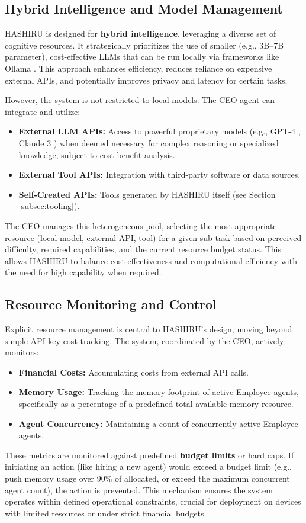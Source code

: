 \documentclass[conference]{IEEEtran}
\begin{document}
\subsection{Hybrid Intelligence and Model Management}
HASHIRU is designed for \textbf{hybrid intelligence}, leveraging a diverse set of cognitive resources. It strategically prioritizes the use of smaller (e.g., 3B--7B parameter), cost-effective LLMs that can be run locally via frameworks like Ollama \cite{ollama}. This approach enhances efficiency, reduces reliance on expensive external APIs, and potentially improves privacy and latency for certain tasks.

However, the system is not restricted to local models. The CEO agent can integrate and utilize:
\begin{itemize}
    \item \textbf{External LLM APIs:} Access to powerful proprietary models (e.g., GPT-4 \cite{openai2023gpt4}, Claude 3 \cite{anthropic2024claude}) when deemed necessary for complex reasoning or specialized knowledge, subject to cost-benefit analysis.
    \item \textbf{External Tool APIs:} Integration with third-party software or data sources.
    \item \textbf{Self-Created APIs:} Tools generated by HASHIRU itself (see Section \ref{subsec:tooling}).
\end{itemize}
The CEO manages this heterogeneous pool, selecting the most appropriate resource (local model, external API, tool) for a given sub-task based on perceived difficulty, required capabilities, and the current resource budget status. This allows HASHIRU to balance cost-effectiveness and computational efficiency with the need for high capability when required.

\subsection{Resource Monitoring and Control}
\label{subsec:resource_mgmt}
Explicit resource management is central to HASHIRU's design, moving beyond simple API key cost tracking. The system, coordinated by the CEO, actively monitors:
\begin{itemize}
    \item \textbf{Financial Costs:} Accumulating costs from external API calls.
    \item \textbf{Memory Usage:} Tracking the memory footprint of active Employee agents, specifically as a percentage of a predefined total available memory resource.
    \item \textbf{Agent Concurrency:} Maintaining a count of concurrently active Employee agents.
\end{itemize}
These metrics are monitored against predefined \textbf{budget limits} or hard caps. If initiating an action (like hiring a new agent) would exceed a budget limit (e.g., push memory usage over 90\% of allocated, or exceed the maximum concurrent agent count), the action is prevented. This mechanism ensures the system operates within defined operational constraints, crucial for deployment on devices with limited resources or under strict financial budgets.
\end{document}
